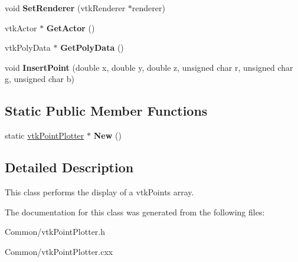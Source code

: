 \begin{DoxyCompactItemize}
\item 
\hypertarget{classvtkPointPlotter_ae08aa847999e303e9023f0e60001cc3f}{
void {\bfseries SetRenderer} (vtkRenderer $\ast$renderer)}
\label{classvtkPointPlotter_ae08aa847999e303e9023f0e60001cc3f}

\item 
\hypertarget{classvtkPointPlotter_af741f07ca30d70efecb5a28a0c88b248}{
vtkActor $\ast$ {\bfseries GetActor} ()}
\label{classvtkPointPlotter_af741f07ca30d70efecb5a28a0c88b248}

\item 
\hypertarget{classvtkPointPlotter_a0badd2ebff0f044b7da6d22277408563}{
vtkPolyData $\ast$ {\bfseries GetPolyData} ()}
\label{classvtkPointPlotter_a0badd2ebff0f044b7da6d22277408563}

\item 
\hypertarget{classvtkPointPlotter_a02cb01481dcaa4d5fb093c254834c901}{
void {\bfseries InsertPoint} (double x, double y, double z, unsigned char r, unsigned char g, unsigned char b)}
\label{classvtkPointPlotter_a02cb01481dcaa4d5fb093c254834c901}

\end{DoxyCompactItemize}
\subsection*{Static Public Member Functions}
\begin{DoxyCompactItemize}
\item 
\hypertarget{classvtkPointPlotter_a649b3bdae9b43324fceec259edea1e67}{
static \hyperlink{classvtkPointPlotter}{vtkPointPlotter} $\ast$ {\bfseries New} ()}
\label{classvtkPointPlotter_a649b3bdae9b43324fceec259edea1e67}

\end{DoxyCompactItemize}


\subsection{Detailed Description}
This class performs the display of a vtkPoints array. 

The documentation for this class was generated from the following files:\begin{DoxyCompactItemize}
\item 
Common/vtkPointPlotter.h\item 
Common/vtkPointPlotter.cxx\end{DoxyCompactItemize}

